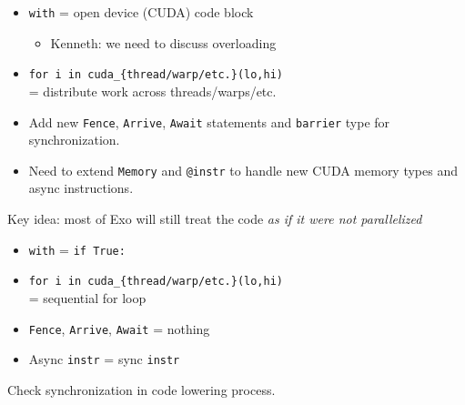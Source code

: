 \begin{minipage}[t]{0.5\textwidth}\fixminipage
{}
\begin{itemize}
  \item \texttt{with} = open device (CUDA) code block
  \begin{itemize}
    \item Kenneth: we need to discuss overloading
  \end{itemize}
  \item \texttt{for i in cuda\_\{thread/warp/etc.\}(lo,hi)}\\ = distribute work across threads/warps/etc.
  \item Add new \texttt{Fence}, \texttt{Arrive}, \texttt{Await} statements and \texttt{barrier} type for synchronization.
  \item Need to extend \texttt{Memory} and \texttt{@instr} to handle new CUDA memory types and async instructions.
\end{itemize}


Key idea: most of Exo will still treat the code \textit{as if it were not parallelized}

\begin{itemize}
  \item \texttt{with} = \texttt{if True:}
  \item \texttt{for i in cuda\_\{thread/warp/etc.\}(lo,hi)}\\ = sequential for loop
  \item \texttt{Fence}, \texttt{Arrive}, \texttt{Await} = nothing
  \item Async \texttt{instr} = sync \texttt{instr}
\end{itemize}

Check synchronization in code lowering process.

\end{minipage} %
\newpage


